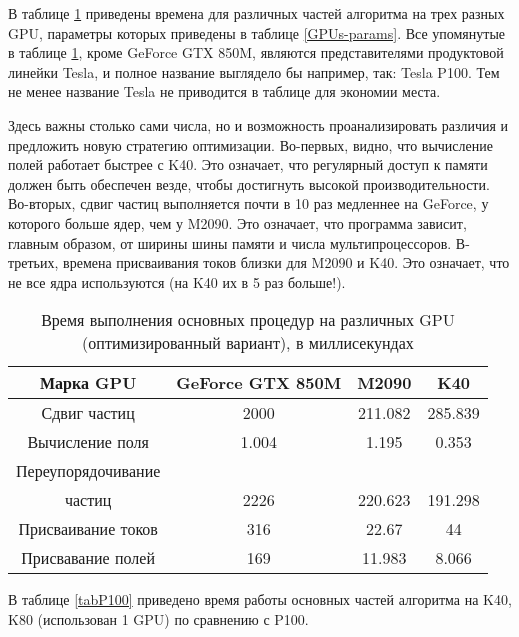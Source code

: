 В таблице \ref {PerfGPUs} приведены времена для различных частей алгоритма на трех разных GPU, параметры которых приведены в таблице \ref{GPUs-params}. Все упомянутые в таблице \ref {PerfGPUs}, кроме GeForce GTX 850M, являются представителями продуктовой линейки Tesla, и полное название выглядело бы например, так: Tesla P100. Тем не менее название Tesla не приводится в таблице для экономии места.

  Здесь важны столько сами числа, но и возможность проанализировать различия и предложить новую стратегию оптимизации. Во-первых, видно, что вычисление полей работает быстрее с K40. Это означает, что регулярный доступ к памяти должен быть обеспечен везде, чтобы достигнуть высокой производительности. Во-вторых, сдвиг частиц выполняется почти в 10 раз медленнее на  GeForce, у которого больше ядер, чем у M2090. Это означает, что программа зависит, главным образом, от ширины шины памяти
и числа мультипроцессоров. В-третьих, времена присваивания токов  близки для M2090 и K40. Это означает, что не все ядра используются (на K40 их в 5 раз больше!).

\begin{table}[ht]
	\begin{center}
		\caption{Время выполнения основных процедур на различных GPU (оптимизированный вариант), в миллисекундах}
		\begin{tabular}{|c|c|c|c|}
			\hline
			Марка GPU        &  GeForce GTX 850M & M2090 & K40 \\ \hline
			Сдвиг частиц       &  2000           &  211.082    & 285.839 \\ \hline
			Вычисление поля    &  1.004          &  1.195      & 0.353   \\ \hline
			Переупорядочивание  &                 &             &         \\
			частиц            &  2226           &  220.623    & 191.298  \\ \hline
			Присваивание токов &  316            &  22.67      & 44 \\ \hline
			Присвавание полей   &  169            &  11.983     & 8.066 \\ \hline
		\end{tabular}
		\label{PerfGPUs}
	\end{center}
\end{table}



В таблице \ref{tabP100} приведено время работы основных частей алгоритма на K40, K80 (использован 1 GPU) по сравнению с P100.

